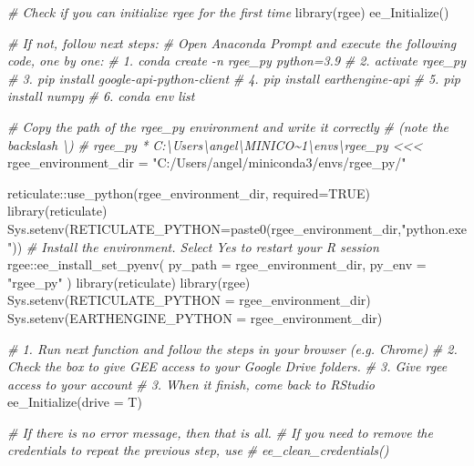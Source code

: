 \documentclass[
  10pt,
  b5paper,
  oneside]{book}
\newenvironment{Shaded}{\begin{snugshade}}{\end{snugshade}}
\newcommand{\AttributeTok}[1]{\textcolor[rgb]{0.77,0.63,0.00}{#1}}
\newcommand{\CommentTok}[1]{\textcolor[rgb]{0.56,0.35,0.01}{\textit{#1}}}
\newcommand{\ConstantTok}[1]{\textcolor[rgb]{0.00,0.00,0.00}{#1}}
\newcommand{\FunctionTok}[1]{\textcolor[rgb]{0.00,0.00,0.00}{#1}}
\newcommand{\NormalTok}[1]{#1}
\newcommand{\OtherTok}[1]{\textcolor[rgb]{0.56,0.35,0.01}{#1}}
\newcommand{\SpecialCharTok}[1]{\textcolor[rgb]{0.00,0.00,0.00}{#1}}
\newcommand{\StringTok}[1]{\textcolor[rgb]{0.31,0.60,0.02}{#1}}
\begin{document}
\begin{Shaded}
\begin{Highlighting}[]
\CommentTok{\# Check if you can initialize rgee for the first time}
\FunctionTok{library}\NormalTok{(rgee)}
\FunctionTok{ee\_Initialize}\NormalTok{() }

\CommentTok{\# If not, follow next steps: }
\CommentTok{\# Open Anaconda Prompt and execute the following code, one by one:}
\CommentTok{\# 1. conda create {-}n rgee\_py python=3.9}
\CommentTok{\# 2. activate rgee\_py}
\CommentTok{\# 3. pip install google{-}api{-}python{-}client}
\CommentTok{\# 4. pip install earthengine{-}api}
\CommentTok{\# 5. pip install numpy}
\CommentTok{\# 6. conda env list}

\CommentTok{\# Copy the path of the rgee\_py environment and write it correctly }
\CommentTok{\# (note the backslash \textbackslash{})}
\CommentTok{\# rgee\_py            *  C:\textbackslash{}Users\textbackslash{}angel\textbackslash{}MINICO\textasciitilde{}1\textbackslash{}envs\textbackslash{}rgee\_py \textless{}\textless{}\textless{}}
\NormalTok{rgee\_environment\_dir }\OtherTok{=} \StringTok{"C:/Users/angel/miniconda3/envs/rgee\_py/"}

\NormalTok{reticulate}\SpecialCharTok{::}\FunctionTok{use\_python}\NormalTok{(rgee\_environment\_dir, }\AttributeTok{required=}\ConstantTok{TRUE}\NormalTok{)}
\FunctionTok{library}\NormalTok{(reticulate)}
\FunctionTok{Sys.setenv}\NormalTok{(}\AttributeTok{RETICULATE\_PYTHON=}\FunctionTok{paste0}\NormalTok{(rgee\_environment\_dir,}\StringTok{"python.exe"}\NormalTok{))}
\CommentTok{\# Install the environment. Select \textquotesingle{}Yes\textquotesingle{} to restart your R session}
\NormalTok{rgee}\SpecialCharTok{::}\FunctionTok{ee\_install\_set\_pyenv}\NormalTok{(}
  \AttributeTok{py\_path =}\NormalTok{ rgee\_environment\_dir,}
  \AttributeTok{py\_env =} \StringTok{"rgee\_py"} 
\NormalTok{)}
\FunctionTok{library}\NormalTok{(reticulate)}
\FunctionTok{library}\NormalTok{(rgee)}
\FunctionTok{Sys.setenv}\NormalTok{(}\AttributeTok{RETICULATE\_PYTHON =}\NormalTok{ rgee\_environment\_dir)}
\FunctionTok{Sys.setenv}\NormalTok{(}\AttributeTok{EARTHENGINE\_PYTHON =}\NormalTok{ rgee\_environment\_dir)}

\CommentTok{\# 1. Run next function and follow the steps in your browser (e.g. Chrome)}
\CommentTok{\# 2. Check the box to give GEE access to your Google Drive folders. }
\CommentTok{\# 3. Give rgee access to your account}
\CommentTok{\# 3. When it finish, come back to RStudio}
\FunctionTok{ee\_Initialize}\NormalTok{(}\AttributeTok{drive =}\NormalTok{ T)}

\CommentTok{\# If there is no error message, then that is all.}
\CommentTok{\# If you need to remove the credentials to repeat the previous step, use}
\CommentTok{\# ee\_clean\_credentials()}
\end{Highlighting}
\end{Shaded}
\end{document}
